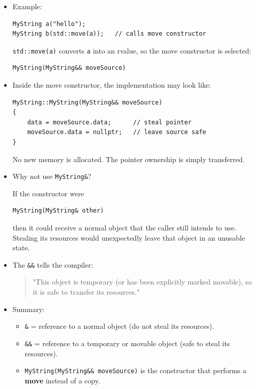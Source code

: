 \documentclass[10pt]{article}
\begin{document}
\begin{itemize}
\begin{itemize}
    These objects are about to disappear, so C++ allows their resources to be
    transferred instead of copied.

    \item Example:
\begin{verbatim}
MyString a("hello");
MyString b(std::move(a));   // calls move constructor
\end{verbatim}

    \verb|std::move(a)| converts \verb|a| into an rvalue, so the move constructor
    is selected:
\begin{verbatim}
MyString(MyString&& moveSource)
\end{verbatim}

    \item Inside the move constructor, the implementation may look like:
\begin{verbatim}
MyString::MyString(MyString&& moveSource)
{
    data = moveSource.data;      // steal pointer
    moveSource.data = nullptr;   // leave source safe
}
\end{verbatim}

    No new memory is allocated. The pointer ownership is simply transferred.

    \item Why not use \verb|MyString&|?

    If the constructor were
\begin{verbatim}
MyString(MyString& other)
\end{verbatim}

    then it could receive a normal object that the caller still intends to use.
    Stealing its resources would unexpectedly leave that object in an unusable state.

    \item The \verb|&&| tells the compiler:
    \begin{quote}
    "This object is temporary (or has been explicitly marked movable), so it is
    safe to transfer its resources."
    \end{quote}

    \item Summary:
    \begin{itemize}
        \item \verb|&| = reference to a normal object (do not steal its resources).
        \item \verb|&&| = reference to a temporary or movable object (safe to steal its resources).
        \item \verb|MyString(MyString&& moveSource)| is the constructor that performs a \textbf{move} instead of a copy.
    \end{itemize}
\end{itemize}


\end{itemize}
\end{document}
